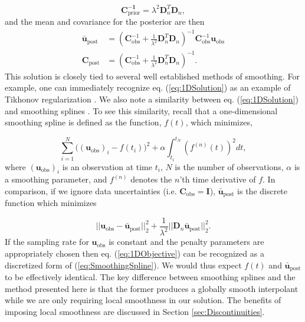\documentclass[10pt,a4paper]{article}
\begin{document}
\begin{equation}\label{eq:ExplicitPrior1D}
\mathbf{C^{-1}_\mathrm{prior}}= \lambda^2\mathbf{D}_n^T\mathbf{D}_n,
\end{equation}
and the mean and covariance for the posterior are then 
\begin{equation}\label{eq:1DSolution}
\begin{split}
\mathbf{\bar{u}}_\mathrm{post} &= (\mathbf{C}_\mathrm{obs}^{-1} +   
                   \frac{1}{\lambda^2}\mathbf{D}_n^T\mathbf{D}_n)^{-1}\mathbf{C}_\mathrm{obs}^{-1}
                   \mathbf{u}_\mathrm{obs}
\\
\mathbf{C}_\mathrm{post} &= (\mathbf{C}_\mathrm{obs}^{-1} +   
                            \frac{1}{\lambda^2}\mathbf{D}_n^T\mathbf{D}_n)^{-1}.
\end{split}
\end{equation}
This solution is closely tied to several well established methods of smoothing.  For example, one can immediately recognize eq. (\ref{eq:1DSolution}) as an example of Tikhonov regularization \citep{Tikhonov1978}. We also note a similarity between eq. (\ref{eq:1DSolution}) and smoothing splines \citep{Wahba1990}.  To see this similarity, recall that a one-dimensional smoothing spline is defined as the function, $f(t)$, which minimizes,

\begin{equation}\label{eq:SmoothingSpline}
\sum_{i=1}^N \big((\mathbf{u_\mathrm{obs}})_i - f(t_i)\big)^2 + \alpha \int_{t_1}^{t_N} \left(f^{(n)}(t)\right)^2 dt,
\end{equation}
where $(\mathbf{u_\mathrm{obs}})_i$ is an observation at time $t_i$, $N$ is the number of observations, $\alpha$ is a smoothing parameter, and $f^{(n)}$ denotes the $n$'th time derivative of $f$.
In comparison, if we ignore data uncertainties (i.e. $\mathbf{C}_\mathrm{obs}=\mathbf{I}$), $\mathbf{\bar{u}}_\mathrm{post}$ is the discrete function which minimizes  

\begin{equation}\label{eq:1DObjective}
||\mathbf{u}_\mathrm{obs} - \mathbf{\bar{u}}_\mathrm{post}||_2^2 + \frac{1}{\lambda^2}||\mathbf{D}_n\mathbf{\bar{u}}_\mathrm{post}||_2^2.
\end{equation} 
If the sampling rate for $\mathbf{u}_\mathrm{obs}$ is constant and the penalty parameters are appropriately chosen then eq. (\ref{eq:1DObjective}) can be recognized as a discretized form of (\ref{eq:SmoothingSpline}).  We would thus expect $f(t)$ and $\mathbf{\bar{u}}_\mathrm{post}$ to be effectively identical.  The key difference between smoothing splines and the method presented here is that the former produces a globally smooth interpolant while we are only requiring local smoothness in our solution.  The benefits of imposing local smoothness are discussed in Section \ref{sec:Discontinuities}. 
\end{document}

